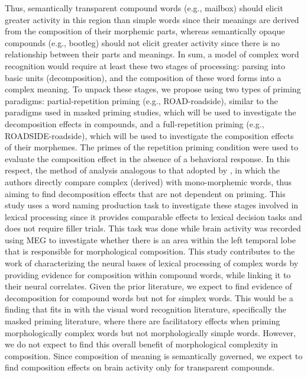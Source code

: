 \documentclass{frontiersSCNS}
\begin{document}
    Thus, semantically transparent compound words (e.g., mailbox) should elicit greater activity in this region than simple words since their meanings are derived from the composition of their morphemic parts, whereas semantically opaque compounds (e.g., bootleg) should not elicit greater activity since there is no relationship between their parts and meanings. In sum, a model of complex word recognition would require at least these two stages of processing: parsing into basic units (decomposition), and the composition of these word forms into a complex meaning. To unpack these stages, we propose using two types of priming paradigms: partial-repetition priming (e.g., ROAD-roadside), similar to the paradigms used in masked priming studies, which will be used to investigate the decomposition effects in compounds, and a full-repetition priming (e.g., ROADSIDE-roadside), which will be used to investigate the composition effects of their morphemes. The primes of the repetition priming condition were used to evaluate the composition effect in the absence of a behavioral response. In this respect, the method of analysis analogous to that adopted by \citet*{Zweig:2009}, in which the authors directly compare complex (derived) with mono-morphemic words, thus aiming to find decomposition effects that are not dependent on priming. This study uses a word naming production task to investigate these stages involved in lexical processing since it provides comparable effects to lexical decision tasks \citep*{Neely:1991} and does not require filler trials. This task was done while brain activity was recorded using MEG to investigate whether there is an area within the left temporal lobe that is responsible for morphological composition. This study contributes to the work of characterizing the neural bases of lexical processing of complex words by providing evidence for composition within compound words, while linking it to their neural correlates. Given the prior literature, we expect to find evidence of decomposition for compound words but not for simplex words. This would be a finding that fits in with the visual word recognition literature, specifically the masked priming literature, where there are facilitatory effects when priming morphologically complex words but not morphologically simple words. However, we do not expect to find this overall benefit of morphological complexity in composition. Since composition of meaning is semantically governed, we expect to find composition effects on brain activity only for transparent compounds. 
\end{document}
